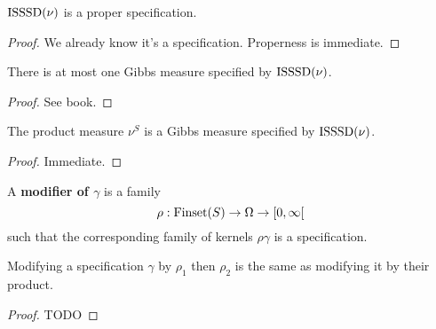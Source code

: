 \begin{lemma}
    \label{lem:isssd-proper-spec}
    \leanok

    $\operatorname{ISSSD}(\nu)$ is a proper specification.
\end{lemma}
\begin{proof}

    We already know it's a specification. Properness is immediate.
\end{proof}

\begin{lemma}
    \label{lem:isssd-gibbs-meas-uniqueness}

    There is at most one Gibbs measure specified by $\operatorname{ISSSD}(\nu)$.
\end{lemma}
\begin{proof}

    See book.
\end{proof}

\begin{lemma}
    \label{lem:isssd-gibbs-meas-existence}
    \leanok{}

    The product measure $\nu^S$ is a Gibbs measure specified by $\operatorname{ISSSD}(\nu)$.
\end{lemma}
\begin{proof}

   Immediate.
\end{proof}

\begin{definition}[Modifier]
    \label{def:modif}
    \leanok{}

    A {\bf modifier of $\gamma$} is a family
    \[\rho : \operatorname{Finset}(S) \to \Omega \to [0, \infty[\]
    such that the corresponding family of kernels $\rho\gamma$ is a specification.
\end{definition}

\begin{lemma}
    \label{lem:modif-modif}
    \leanok{}

    Modifying a specification $\gamma$ by $\rho_1$ then $\rho_2$ is the same as modifying it by their product.
\end{lemma}
\begin{proof}
    \uses{}
    \leanok

    TODO
\end{proof}

